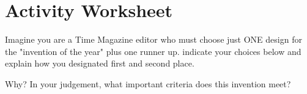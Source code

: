 \documentclass[11pt, a4paper]{article}
\begin{document}
\setcounter{page}{1}

\tableofcontents
\newpage
{}
\setcounter{page}{1}

\section{Activity Worksheet}
Imagine you are a Time Magazine editor who must choose just ONE design for the "invention of the
year" plus one runner up. indicate your choices below and explain how you designated first and
second place.

Why? In your judgement, what important criteria does this invention meet?
\end{document}
